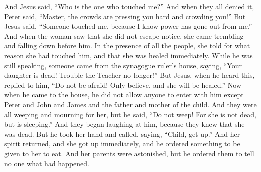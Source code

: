 \begin{biblechapter}
\verse And Jesus said, “Who is the one who touched me?” And when they all denied it, Peter said, “Master, the crowds are pressing you hard and crowding you!”
\verse But Jesus said, “Someone touched me, because I know power has gone out from me.”
\verse And when the woman saw that she did not escape notice, she came trembling and falling down before him. In the presence of all the people, she told for what reason she had touched him, and that she was healed immediately.
\verse While he was still speaking, someone came from the synagogue ruler’s house, saying, “Your daughter is dead! Trouble the Teacher no longer!”
\verse But Jesus, when he heard this, replied to him, “Do not be afraid! Only believe, and she will be healed.”
\verse Now when he came to the house, he did not allow anyone to enter with him except Peter and John and James and the father and mother of the child.
\verse And they were all weeping and mourning for her, but he said, “Do not weep! For she is not dead, but is sleeping.”
\verse And they began laughing at him, because they knew that she was dead.
\verse But he took her hand and called, saying, “Child, get up.”
\verse And her spirit returned, and she got up immediately, and he ordered something to be given to her to eat.
\verse And her parents were astonished, but he ordered them to tell no one what had happened.
\end{biblechapter}

